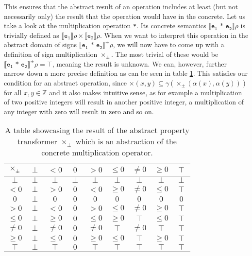 

\noindent This ensures that the abstract result of an operation includes at least (but not necessarily only) the result that the operation would have in the concrete. Let us take a look at the multiplication operation \texttt{*}. Its concrete semantics $\llbracket\mathtt{e_1\texttt{ * } e_2}\rrbracket\rho$ is trivially defined as $\llbracket\mathtt{e_1}\rrbracket\rho \times\llbracket\mathtt{e_2}\rrbracket\rho$. When we want to interpret this operation in the abstract domain of signs $\llbracket\mathtt{e_1\texttt{ * } e_2}\rrbracket^\pm\rho$, we will now have to come up with a definition of sign multiplication $\times_\pm$. The most trivial of these would be $\llbracket\mathtt{e_1\texttt{ * } e_2}\rrbracket^\pm\rho=\top$, meaning the result is unknown. We can, however, further narrow down a more precise definition as can be seen in table \ref{table:multiply}. This satisfies our condition for an abstract operation, since $\times(x,y)\subseteq\gamma(\times_\pm(\alpha(x),\alpha(y)))$ for all $x,y\in\mathbb{Z}$ and it also makes intuitive sense, as for example a multiplication of two positive integers will result in another positive integer, a multiplication of any integer with zero will result in zero and so on.


\begin{table}[hbt]
\begin{center}
\begin{tabular}{c|c|c|c|c|c|c|c|c}
            $\times_\pm$& $\perp$ & $<0$    & $0$     & $>0$    & $\leq0$ & $\neq0$ & $\geq0$ & $\top$  \\ \hline
            $\perp$ & $\perp$ & $\perp$ & $\perp$ & $\perp$ & $\perp$ & $\perp$ & $\perp$ & $\perp$ \\
            $<0$    & $\perp$ & $>0$    & $0$     & $<0$    & $\geq0$ & $\neq0$ & $\leq0$ & $\top$  \\
            $0$     & $\perp$ & $0$     & $0$     & $0$     & $0$     & $0$     & $0$     & $0$     \\
            $>0$    & $\perp$ & $<0$    & $0$     & $>0$    & $\leq0$ & $\neq0$ & $\geq0$ & $\top$  \\
            $\leq0$ & $\perp$ & $\geq0$ & $0$     & $\leq0$ & $\geq0$ & $\top$  & $\leq0$ & $\top$  \\
            $\neq0$ & $\perp$ & $\neq0$ & $0$     & $\neq0$ & $\top$  & $\neq0$ & $\top$  & $\top$  \\
            $\geq0$ & $\perp$ & $\leq0$ & $0$     & $\geq0$ & $\leq0$ & $\top$  & $\geq0$ & $\top$  \\
            $\top$  & $\perp$ & $\top$  & $0$     & $\top$  & $\top$  & $\top$  & $\top$  & $\top$ 
        \end{tabular}
  \caption{A table showcasing the result of the abstract property transformer $\times_\pm$ which is an abstraction of the concrete multiplication operator.}\label{table:multiply}
  \end{center}
\end{table}

